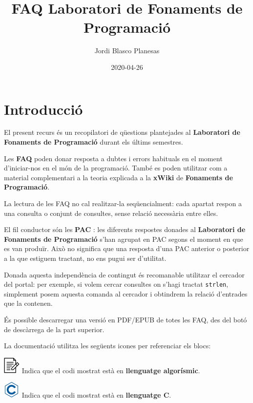 \documentclass[]{book}
\title{FAQ Laboratori de Fonaments de Programació}
\author{Jordi Blasco Planesas}
\date{2020-04-26}
\begin{document}
\maketitle

{
\setcounter{tocdepth}{1}
\tableofcontents
}
\hypertarget{introduccio}{%
\chapter*{Introducció}\label{introduccio}}

El present recurs és un recopilatori de qüestions plantejades al \textbf{Laboratori de Fonaments de Programació} durant els últims semestres.

Les \textbf{FAQ} poden donar resposta a dubtes i errors habituals en el moment d'iniciar-nos en el món de la programació. També es poden utilitzar com a material complementari a la teoria explicada a la \textbf{xWiki} de \textbf{Fonaments de Programació}.

La lectura de les FAQ no cal realitzar-la seqüencialment: cada apartat respon a una consulta o conjunt de consultes, sense relació necessària entre elles.

El fil conductor són les \textbf{PAC} : les diferents respostes donades al \textbf{Laboratori de Fonaments de Programació} s'han agrupat en PAC segons el moment en que es van produïr. Això no significa que una resposta d'una PAC anterior o posterior a la que estiguem tractant, no ens pugui ser d'utilitat.

Donada aquesta independència de contingut és recomanable utilitzar el cercador del portal: per exemple, si volem cercar consultes on s'hagi tractat \texttt{strlen}, simplement posem aquesta comanda al cercador i obtindrem la relació d'entrades que la contenen.

És possible descarregar una versió en PDF/EPUB de totes les FAQ, des del botó de descàrrega de la part superior.

La documentació utilitza les següents icones per referenciar els blocs:

\includegraphics{./img/alg.png} Indica que el codi mostrat està en \textbf{llenguatge algorísmic}.

\includegraphics{./img/c.png} Indica que el codi mostrat està en \textbf{llenguatge C}.
\end{document}
